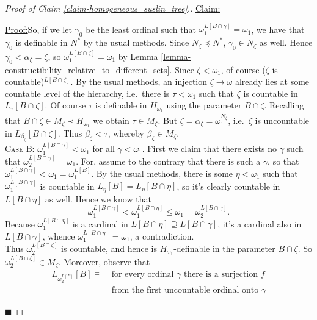 \documentclass[11pt,a4paper]{report}
\theoremstyle{definition}
\theoremstyle{num.custom-title}
\theoremstyle{custom-title}
\newenvironment{claim}[1]{\par\noindent\underline{Claim#1:}\space}{} %
\newenvironment{claimproof}[1]{\par\noindent\underline{Proof:}\space#1}{\leavevmode\unskip\penalty9999 \hbox{}\nobreak\hfill\quad\hbox{$\blacksquare$}} %
\newcommand{\ol}{\overline}
\begin{document}
\begin{proof}[Proof of Claim \ref{claim-homogeneous_suslin_tree}.]
\begin{claim}{}
\begin{claimproof}
So, if we let $\gamma_0$ be the least ordinal such that $\omega_1^{L[B \cap \gamma]} = \omega_1$, we have that $\gamma_0$ is definable in $N^*$ by the usual methods. Since $N_\zeta \preceq N^*$, $\gamma_0 \in N_\zeta$ as well. Hence $\gamma_0 < \alpha_\zeta = \zeta$, so $\omega_1^{L[B \cap \zeta]} = \omega_1$ by Lemma \ref{lemma-constructibility_relative_to_different_sets}. Since $\zeta < \omega_1$, of course ($\zeta$ is countable)$^{L[B \cap \zeta]}$. By the usual methods, an injection $\zeta \to \omega$ already lies at some countable level of the hierarchy, i.e.\ there is $\tau < \omega_1$ such that $\zeta$ is countable in $L_\tau [B \cap \zeta]$. Of course $\tau$ is definable in $H_{\omega_1}$ using the parameter $B \cap \zeta$.
Recalling that $B \cap \zeta \in M_\zeta \prec H_{\omega_1}$ we obtain $\tau \in M_\zeta$. But $\zeta = \alpha_\zeta = \omega_1^{\ol{N}_\zeta}$, i.e.\ $\zeta$ is uncountable in $L_{\beta_\zeta}[B \cap \zeta]$. Thus $\beta_\zeta < \tau$, whereby $\beta_\zeta \in M_\zeta$.
\\[6pt]
\textsc{Case B:} $\omega_1^{L[B \cap \gamma]} < \omega_1$ for all $\gamma < \omega_1$. First we claim that there exists no $\gamma$ such that $\omega_2^{L[B \cap \gamma]} = \omega_1$. For, assume to the contrary that there is such a $\gamma$, so that $\omega_1^{L[B \cap \gamma]} < \omega_1 = \omega_1^{L[B]}$. By the usual methods, there is some $\eta < \omega_1$ such that $\omega_1^{L[B \cap \gamma]}$ is countable in $L_\eta [B] = L_\eta [B \cap \eta]$, so it's clearly countable in $L[B \cap \eta]$ as well.
Hence we know that
\[
\omega_1^{L[B \cap \gamma]} < \omega_1^{L[B \cap \eta]} \leq \omega_1 = \omega_2^{L[B \cap \gamma]}.
\]
Because $\omega_1^{L[B \cap \eta]}$ is a cardinal in $L[B \cap \eta] \supseteq L[B \cap \gamma]$, it's a cardinal also in $L[B \cap \gamma]$, whence $\omega_1^{L[B \cap \eta]} = \omega_1$, a contradiction.\\
Thus $\omega_2^{L[B \cap \zeta]}$ is countable, and hence is $H_{\omega_1}$-definable in the parameter $B \cap \zeta$. So $\omega_2^{L[B \cap \zeta]} \in M_\zeta$. Moreover, observe that
\begin{align*}
L_{\omega_2^{L[B]}}[B] \models & \text{ for every ordinal $\gamma$ there is a surjection $f$}\\
& \text{ from the first uncountable ordinal onto $\gamma$}
\end{align*}

\end{claimproof}
\end{claim}
\end{proof}
\end{document}
